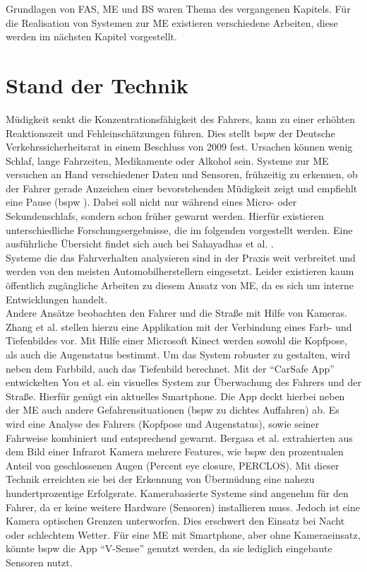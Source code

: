 {Grundlagen von \acl{FAS}, \acl{ME} und \acl{BS} waren Thema des vergangenen Kapitels. Für die Realisation von Systemen zur \acl{ME} existieren verschiedene Arbeiten, diese werden im nächsten Kapitel vorgestellt.

\section{Stand der Technik}
\label{chap:me}
Müdigkeit senkt die Konzentrationsfähigkeit des Fahrers, kann zu einer erhöhten Reaktionszeit und Fehleinschätzungen führen. Dies stellt \acl{bspw} der Deutsche Verkehrssicherheitsrat in einem Beschluss von 2009 \cite{DVR:Online} fest. Ursachen können wenig Schlaf, lange Fahrzeiten, Medikamente oder Alkohol sein.
Systeme zur \acl{ME} versuchen an Hand verschiedener Daten und Sensoren, frühzeitig zu erkennen, ob der Fahrer gerade Anzeichen einer bevorstehenden Müdigkeit zeigt und empfiehlt eine Pause (\acl{bspw} \cite{Daimler}). Dabei soll nicht nur während eines Micro- oder Sekundenschlafs, sondern schon früher gewarnt werden. Hierfür existieren unterschiedliche Forschungsergebnisse, die im folgenden vorgestellt werden. Eine ausführliche Übersicht findet sich auch bei Sahayadhas et al.  \cite{Sahayadhas_121216937}.\\

Systeme die das Fahrverhalten analysieren sind in der Praxis weit verbreitet und werden von den meisten Automobilherstellern eingesetzt. Leider existieren kaum öffentlich zugängliche Arbeiten zu diesem Ansatz von  \acl{ME}, da es sich um interne Entwicklungen handelt. \\

Andere Ansätze beobachten den Fahrer und die Straße mit Hilfe von Kameras. Zhang et al. \cite{Zhang:2015:RSD:2753829.2629482} stellen hierzu eine Applikation mit der Verbindung eines Farb- und Tiefenbildes vor. Mit Hilfe einer Microsoft Kinect werden sowohl die Kopfpose, als auch die Augenstatus bestimmt. Um das System robuster zu gestalten, wird neben dem Farbbild, auch das Tiefenbild berechnet. Mit der "`CarSafe App"' entwickelten You et al. \cite{You:2013:CAA:2462456.2465428} ein visuelles System zur Überwachung des Fahrers und der Straße. Hierfür genügt ein aktuelles Smartphone. Die App deckt hierbei neben der \acl{ME} auch andere Gefahrensituationen  (\acl{bspw} zu dichtes Auffahren) ab. Es wird eine Analyse des Fahrers (Kopfpose und Augenstatus), sowie seiner Fahrweise kombiniert und entsprechend gewarnt. Bergasa et al. \cite{Bergasa_1603553} extrahierten aus dem Bild einer Infrarot Kamera mehrere Features, wie \acl{bspw} den prozentualen Anteil von geschlossenen Augen (Percent eye closure, PERCLOS). Mit dieser Technik erreichten sie bei der Erkennung von Übermüdung eine nahezu hundertprozentige Erfolgsrate.
Kamerabasierte Systeme sind angenehm für den Fahrer, da er keine weitere Hardware (Sensoren) installieren muss. Jedoch ist eine Kamera optischen Grenzen unterworfen.  Dies erschwert den Einsatz bei Nacht oder schlechtem Wetter. Für eine \acl{ME} mit Smartphone, aber ohne Kameraeinsatz, könnte \acl{bspw} die App "`V-Sense"'  \cite{Chen:2015:ISV:2742647.2742659} genutzt werden, da sie lediglich  eingebaute Sensoren nutzt.\\

}
